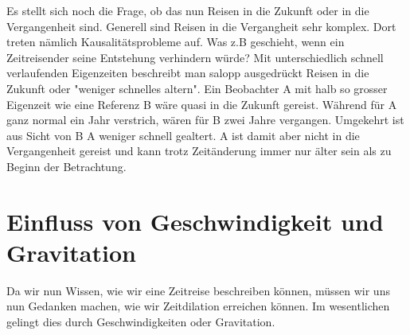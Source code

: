 \begin{refsection}
Es stellt sich noch die Frage, ob das nun Reisen in die Zukunft oder in die Vergangenheit sind. Generell sind Reisen in die Vergangheit sehr komplex. Dort treten nämlich Kausalitätsprobleme auf. Was z.B geschieht, wenn ein Zeitreisender seine Entstehung verhindern würde?
Mit unterschiedlich schnell verlaufenden Eigenzeiten beschreibt man salopp ausgedrückt Reisen in die Zukunft oder "weniger schnelles altern". Ein Beobachter A mit halb so grosser Eigenzeit wie eine Referenz B wäre quasi in die Zukunft gereist. Während für A ganz normal ein Jahr verstrich, wären für B zwei Jahre vergangen. Umgekehrt ist aus Sicht von B A weniger schnell gealtert. A ist damit aber nicht in die Vergangenheit gereist und kann trotz Zeit\"anderung immer nur älter sein als zu Beginn der Betrachtung.
\section{Einfluss von Geschwindigkeit und Gravitation}
Da wir nun Wissen, wie wir eine Zeitreise beschreiben können, müssen wir uns nun Gedanken machen, wie wir Zeitdilation erreichen können. Im wesentlichen gelingt dies durch Geschwindigkeiten oder Gravitation. 

\end{refsection}

